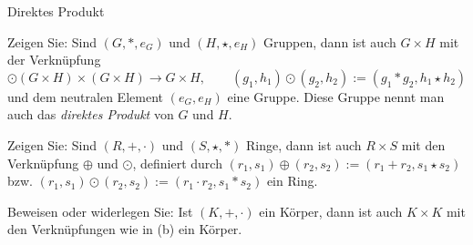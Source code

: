 \begin{Problem}\label{pr:linalg1-4.1}
	Direktes Produkt
	\begin{parts}
		\item Zeigen Sie: Sind $(G,*,e_G)$ und $(H,\star, e_H)$ Gruppen, dann ist auch $G\times H$ mit der Verknüpfung
			\[
			\odot\left( G\times H \right) \times \left( G\times H \right) \to G\times H, \qquad (g_1,h_1)\odot(g_2,h_2):=(g_1*g_2,h_1\star h_2)
			\] 
			und dem neutralen Element $(e_G,e_H)$ eine Gruppe. Diese Gruppe nennt man auch das \emph{direktes Produkt} von $G$ und $H$.
		\item Zeigen Sie: Sind $(R,+,\cdot)$ und $(S,\star,*)$ Ringe, dann ist auch $R\times S$ mit den Verkn\"{u}pfung $\oplus$ und $\odot$, definiert durch $(r_1,s_1)\oplus (r_2,s_2):=(r_1+r_2,s_1\star s_2)$ bzw. $(r_1,s_1)\odot (r_2,s_2):= (r_1\cdot r_2, s_1* s_2)$ ein Ring.
		\item Beweisen oder widerlegen Sie: Ist $(K,+,\cdot)$ ein Körper, dann ist auch $K \times K$ mit den Verknüpfungen wie in (b) ein Körper.
	\end{parts}
\end{Problem}
